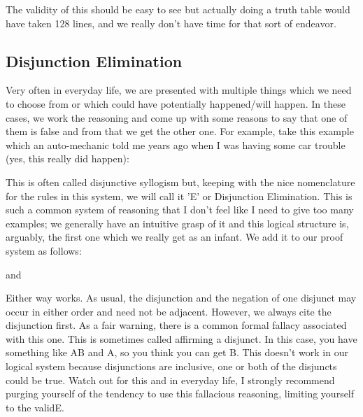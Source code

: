 The validity of this should be easy to see but actually doing a truth table would have taken 128 lines, and we really don't have time for that sort of endeavor.

\subsection{Disjunction Elimination}

Very often in everyday life, we are presented with multiple things which we need to choose from or which could have potentially happened/will happen. In these cases, we work the reasoning and come up with some reasons to say that one of them is false and from that we get the other one. For example, take this example which an auto-mechanic told me years ago when I was having some car trouble (yes, this really did happen):


This is often called disjunctive syllogism but, keeping with the nice nomenclature for the rules in this system, we will call it '\eor E' or Disjunction Elimination. This is such a common system of reasoning that I don't feel like I need to give too many examples; we generally have an intuitive grasp of it and this logical structure is, arguably, the first one which we really get as an infant. We add it to our proof system as follows:

and

Either way works. As usual, the disjunction and the negation of one disjunct may occur in either order and need not be adjacent. However, we always cite the disjunction first. As a fair warning, there is a common formal fallacy associated with this one. This is sometimes called affirming a disjunct. In this case, you have something like A\eor B and A, so you think you can get \enot B. This doesn't work in our logical system because disjunctions are inclusive, one or both of the disjuncts could be true. Watch out for this and in everyday life, I strongly recommend purging yourself of the tendency to use this fallacious reasoning, limiting yourself to the valid\eor E.
